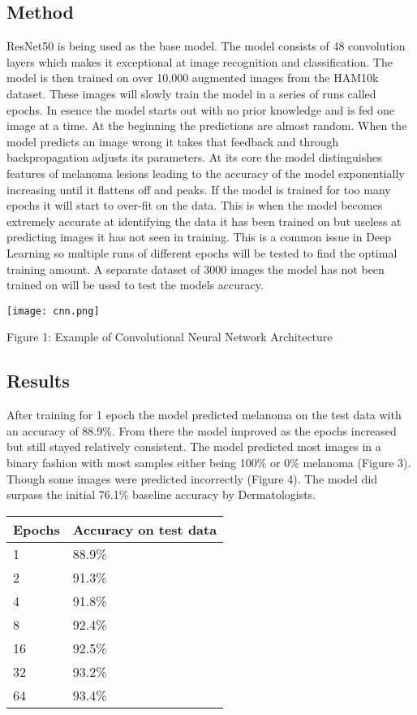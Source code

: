 \documentclass{article}
\begin{document}
\subsection{Method}
ResNet50 is being used as the base model. The model consists of 48 convolution layers which makes it exceptional at image recognition and classification. The model is then trained on over 10,000 augmented images from the HAM10k dataset. These images will slowly train the model in a series of runs called epochs. In esence the model starts out with no prior knowledge and is fed one image at a time. At the beginning the predictions are almost random. When the model predicts an image wrong it takes that feedback and through backpropagation adjusts its parameters. At its core the model distinguishes features of melanoma lesions leading to the accuracy of the model exponentially increasing until it flattens off and peaks. If the model is trained for too many epochs it will start to over-fit on the data. This is when the model becomes extremely accurate at identifying the data it has been trained on but useless at predicting images it has not seen in training. This is a common issue in Deep Learning so multiple runs of different epochs will be tested to find the optimal training amount. A separate dataset of 3000 images the model has not been trained on will be used to test the models accuracy.

\begin{center}
\texttt{[image: cnn.png]}
\end{center}
Figure 1: Example of Convolutional Neural Network Architecture
\subsection*{Results}
After training for 1 epoch the model predicted melanoma on the test data with an accuracy of 88.9\%. From there the model improved as the epochs increased but still stayed relatively consistent. The model predicted most images in a binary fashion with most samples either being 100\% or 0\% melanoma (Figure 3). Though some images were predicted incorrectly (Figure 4). The model did surpass the initial 76.1\% baseline accuracy by Dermatologists.

\begin{center}
\begin{tabular}{ | m{2cm} | m{4cm}| } 
\hline
Epochs &
Accuracy on test data \\
\hline
1 &
88.9\% \\
\hline
2 &
91.3\% \\
\hline
4 &
91.8\% \\
\hline
8 &
92.4\% \\
\hline
16 &
92.5\% \\
\hline
32 &
93.2\% \\
\hline
64 &
93.4\% \\ 
\hline
\end{tabular}
\end{center}
\end{document}
